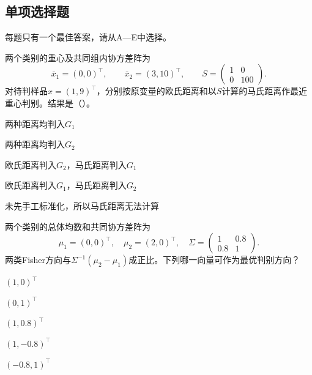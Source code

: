\subsection{单项选择题}
每题只有一个最佳答案，请从A—E中选择。

\par\noindent\begin{minipage}{\linewidth}
两个类别的重心及共同组内协方差阵为
\[
\bar x_1=(0,0)^\top,\qquad \bar x_2=(3,10)^\top,\qquad
S=\begin{pmatrix}1&0\\0&100\end{pmatrix}.
\]
对待判样品$x=(1,9)^\top$，分别按原变量的欧氏距离和以$S$计算的马氏距离作最近重心判别。结果是（\quad）。
\begin{choices}
\item 两种距离均判入$G_1$
\item 两种距离均判入$G_2$
\item 欧氏距离判入$G_2$，马氏距离判入$G_1$
\item 欧氏距离判入$G_1$，马氏距离判入$G_2$
\item 未先手工标准化，所以马氏距离无法计算
\end{choices}
\end{minipage}\par\medskip

\par\noindent\begin{minipage}{\linewidth}
两个类别的总体均数和共同协方差阵为
\[
\mu_1=(0,0)^\top,\quad \mu_2=(2,0)^\top,\quad
\Sigma=\begin{pmatrix}1&0.8\\0.8&1\end{pmatrix}.
\]
两类Fisher方向与$\Sigma^{-1}(\mu_2-\mu_1)$成正比。下列哪一向量可作为最优判别方向？
\begin{choices}
\item $(1,0)^\top$
\item $(0,1)^\top$
\item $(1,0.8)^\top$
\item $(1,-0.8)^\top$
\item $(-0.8,1)^\top$
\end{choices}
\end{minipage}\par\medskip

